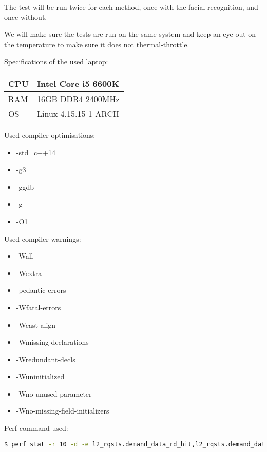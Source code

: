 \documentclass[a4paper]{article}
\begin{document}
The test will be run twice for each method, once with the facial recognition, and once without.

We will make sure the tests are run on the same system and keep an eye out on the temperature to make sure it does not thermal-throttle.

Specifications of the used laptop:
\begin{center}
    \begin{tabular}{ | l | l |}
    \hline
    CPU & Intel Core i5 6600K \cite{ARK} \\ \hline
    RAM & 16GB DDR4 2400MHz \\ \hline
    OS & Linux 4.15.15-1-ARCH \\ \hline
    \end{tabular}
\end{center}

Used compiler optimisations:
\begin{itemize}[noitemsep,nolistsep]
\item -std=c++14
\item -g3
\item -ggdb
\item -g
\item -O1
\end{itemize}

Used compiler warnings:
\begin{itemize}[noitemsep,nolistsep]
\item -Wall
\item -Wextra
\item -pedantic-errors
\item -Wfatal-errors
\item -Wcast-align
\item -Wmissing-declarations
\item -Wredundant-decls
\item -Wuninitialized
\item -Wno-unused-parameter
\item -Wno-missing-field-initializers
\end{itemize}

Perf command used:
\begin{lstlisting}[language=bash]
	$ perf stat -r 10 -d -e l2_rqsts.demand_data_rd_hit,l2_rqsts.demand_data_rd_miss ./vissen}
\end{lstlisting}

\newpage
\end{document}
